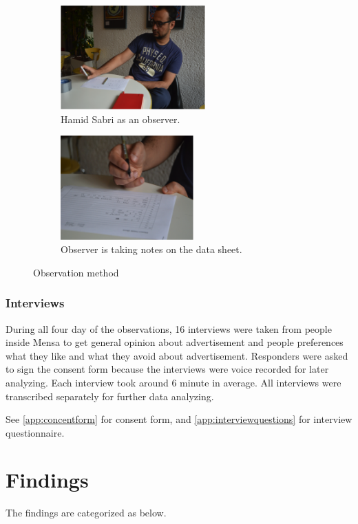 \begin{figure}[H]
    \centering
    \begin{subfigure}[H]{0.45\textwidth}
        \centering
        \includegraphics[width=\textwidth,height=4cm]{Figures/3/hamid}
        \caption{Hamid Sabri as an observer.}
        \label{fig:hamid}
    \end{subfigure}
    \begin{subfigure}[H]{0.45\textwidth}
        \centering
        \includegraphics[width=\textwidth,height=4cm]{Figures/3/observer}
        \caption{Observer is taking notes on the data sheet.}
        \label{fig:Observer}
    \end{subfigure}
    \caption{Observation method}
    \label{fig:observation_env}
\end{figure}


\subsubsection{Interviews}
During all four day of the observations, 16 interviews were taken from people inside Mensa to get general opinion about advertisement and people preferences what they like and what they avoid about advertisement. Responders were asked to sign the consent form because the interviews were voice recorded for later analyzing.  Each interview took around 6 minute in average. All interviews were transcribed separately for further data analyzing.

See \ref{app:concentform} for consent form, and \ref{app:interviewquestions} for interview questionnaire.




\section{Findings}
The findings are categorized as below.


